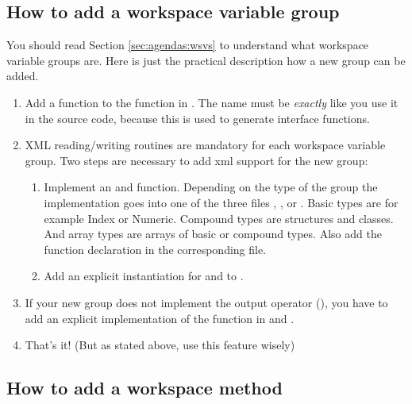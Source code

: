 \subsection{How to add a workspace variable group}

You should read Section \ref{sec:agendas:wsvs} to understand what workspace
variable groups are. Here is just the practical description how a new
group can be added.

\begin{enumerate}
\item Add a  function to
  the function  in .
  The name must be \emph{exactly} like you use it in the source code,
  because this is used to generate interface functions.
\item XML reading/writing routines are mandatory for each workspace variable
  group. Two steps are necessary to add xml support for the new group:
  \begin{enumerate}
  \item Implement an 
    and  function. Depending
    on the type of the group the implementation goes into one
    of the three files ,
    , or
    . Basic types are for example Index
    or Numeric. Compound types are structures and classes. And array types are
    arrays of basic or compound types. Also add the function declaration in the
    corresponding  file.
  \item Add an explicit instantiation for
     and
     to .
  \end{enumerate}
\item If your new group does not implement the output operator
  (), you have to add an explicit implementation
  of the  function in  and
  .
\item That's it! (But as stated above, use this feature wisely)
\end{enumerate}



\subsection{How to add a workspace method}
\label{sec:development:extending:wsm}

